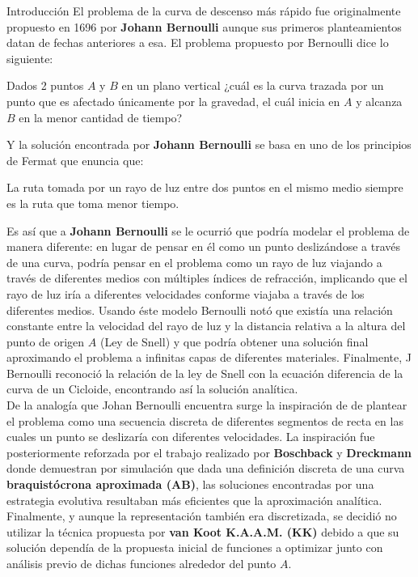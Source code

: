 \documentclass[10pt, letterpaper]{article}
\theoremstyle{definition}
\begin{document}
\begin{section}{Introducción}
    El problema de la curva de descenso más rápido fue originalmente propuesto
    en 1696 por \textbf{Johann Bernoulli} aunque sus primeros planteamientos
    datan de fechas anteriores a esa\cite{3blue1brown}. El problema propuesto
    por Bernoulli dice lo siguiente:
    \begin{displayquote}
        Dados 2 puntos $A$ y $B$ en un plano vertical ¿cuál es la curva trazada
        por un punto que es afectado únicamente por la gravedad, el cuál inicia
        en $A$ y alcanza $B$ en la menor cantidad de tiempo?
    \end{displayquote}

    Y la solución encontrada por \textbf{Johann Bernoulli} se basa en uno de los
    principios de Fermat que enuncia que:
    \begin{displayquote}
        La ruta tomada por un rayo de luz entre dos puntos en el mismo medio
        siempre es la ruta que toma menor tiempo.
    \end{displayquote}

    Es así que a \textbf{Johann Bernoulli} se le ocurrió que podría modelar
    el problema de manera diferente: en lugar de pensar en él como un punto
    deslizándose a través de una curva, podría pensar en el problema como un
    rayo de luz viajando a través de diferentes medios con múltiples índices
    de refracción, implicando que el rayo de luz iría a diferentes velocidades
    conforme viajaba a través de los diferentes medios. Usando éste modelo
    Bernoulli notó que existía una relación constante entre la velocidad del
    rayo de luz y la distancia relativa a la altura del punto de origen $A$
    (Ley de Snell) y que podría obtener una solución final aproximando el
    problema a infinitas capas de diferentes materiales. Finalmente, J Bernoulli
    reconoció la relación de la ley de Snell con la ecuación diferencia de la
    curva de un Cicloide, encontrando así la solución analítica. \\

    De la analogía que Johan Bernoulli encuentra surge la inspiración de
    de plantear el problema como una secuencia discreta de diferentes segmentos
    de recta en las cuales un punto se deslizaría con diferentes velocidades.
    La inspiración fue posteriormente reforzada por el trabajo realizado por
    \textbf{Boschback} y \textbf{Dreckmann} donde demuestran por simulación que
    dada una definición discreta de una curva \textbf{braquistócrona aproximada (AB)},
    las soluciones encontradas por una estrategia evolutiva resultaban más eficientes
    que la aproximación analítica. Finalmente, y aunque la representación también
    era discretizada, se decidió no utilizar la técnica propuesta por
    \textbf{van Koot K.A.A.M. (KK)}\cite{vankoot} debido a que su solución dependía
    de la propuesta inicial de funciones a optimizar junto con análisis previo
    de dichas funciones alrededor del punto $A$.


\end{section}
\end{document}
